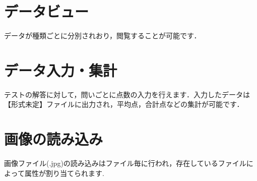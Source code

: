 \documentclass[12pt]{jsreport}
\begin{document}
\section{データビュー}
データが種類ごとに分別されおり，閲覧することが可能です．
\section{データ入力・集計}
テストの解答に対して，問いごとに点数の入力を行えます．入力したデータは【形式未定】ファイルに出力され，平均点，合計点などの集計が可能です．
\section{画像の読み込み}
画像ファイル(.jpg)の読み込みはファイル毎に行われ，存在しているファイルによって属性が割り当てられます.

\newpage
\end{document}
